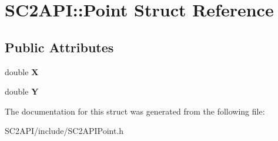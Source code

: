 \hypertarget{struct_s_c2_a_p_i_1_1_point}{}\section{S\+C2\+A\+PI\+:\+:Point Struct Reference}
\label{struct_s_c2_a_p_i_1_1_point}
\subsection*{Public Attributes}
\begin{DoxyCompactItemize}
\item 
double {\bfseries X}\hypertarget{struct_s_c2_a_p_i_1_1_point_a6ecb902f5c54b208fa138293ba690ef8}{}\label{struct_s_c2_a_p_i_1_1_point_a6ecb902f5c54b208fa138293ba690ef8}

\item 
double {\bfseries Y}\hypertarget{struct_s_c2_a_p_i_1_1_point_af100314668f1df205095c11708a1ac11}{}\label{struct_s_c2_a_p_i_1_1_point_af100314668f1df205095c11708a1ac11}

\end{DoxyCompactItemize}


The documentation for this struct was generated from the following file\+:\begin{DoxyCompactItemize}
\item 
S\+C2\+A\+P\+I/include/S\+C2\+A\+P\+I\+Point.\+h\end{DoxyCompactItemize}
